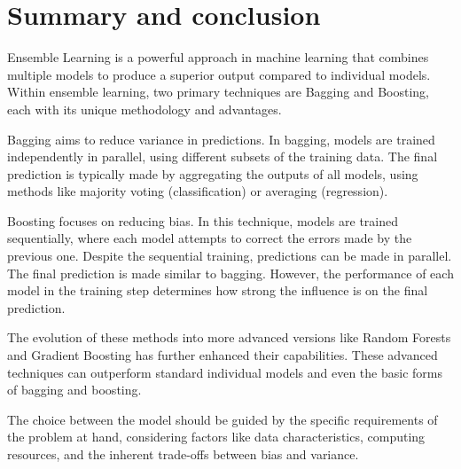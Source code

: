
\section{Summary and conclusion}
Ensemble Learning is a powerful approach in machine learning that combines 
multiple models to produce a superior output compared to individual models.
Within ensemble learning, two primary techniques are Bagging and Boosting, 
each with its unique methodology and advantages.


Bagging aims to reduce variance in predictions. In bagging, models are trained 
independently in parallel, using different subsets of the training data.
The final prediction is typically made by aggregating the outputs of all models,
using methods like majority voting (classification) or averaging (regression).


Boosting focuses on reducing bias. In this technique, models are trained sequentially,
where each model attempts to correct the errors made by the previous one. Despite 
the sequential training, predictions can be made in parallel. The final prediction
is made similar to bagging. However, the performance of each model in the training 
step determines how strong the influence is on the final prediction.


The evolution of these methods into more advanced versions like Random Forests
and Gradient Boosting has further enhanced their capabilities. These advanced 
techniques can outperform standard individual models and even the basic forms 
of bagging and boosting. 


The choice between the model should be guided by the specific requirements of 
the problem at hand, considering factors like data characteristics, computing 
resources, and the inherent trade-offs between bias and variance.
